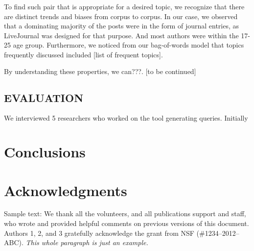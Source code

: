 \documentclass{sigchi}
\begin{document}
To find such pair that is appropriate for a desired topic, we recognize that there are distinct trends and biases from corpus to corpus. In our case, we observed that a dominating majority of the posts were in the form of journal entries, as LiveJournal was designed for that purpose. And most authors were within the 17-25 age group. Furthermore, we noticed from our bag-of-words model that topics frequently discussed included [list of frequent topics]. 

By understanding these properties, we can???. [to be continued] 


\subsection{EVALUATION}
We interviewed 5 researchers who worked on the tool generating queries. Initially

\section{Conclusions}


\section{Acknowledgments}

Sample text: We thank all the volunteers, and all publications support
and staff, who wrote and provided helpful comments on previous
versions of this document. Authors 1, 2, and 3 gratefully acknowledge
the grant from NSF (\#1234--2012--ABC). \textit{This whole paragraph is
  just an example.}




\end{document}
